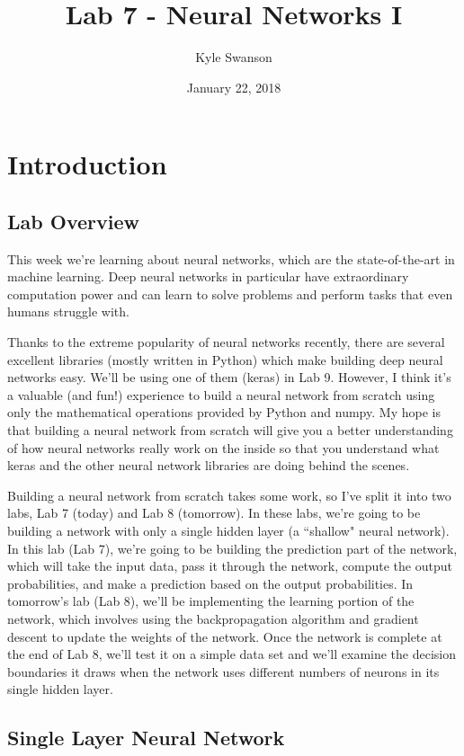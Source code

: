 \documentclass{article}
\title{Lab 7 - Neural Networks I}
\author{Kyle Swanson}
\date{January 22, 2018}
\begin{document}
\maketitle

\section{Introduction}

\subsection{Lab Overview}

This week we're learning about neural networks, which are the state-of-the-art in machine learning. Deep neural networks in particular have extraordinary computation power and can learn to solve problems and perform tasks that even humans struggle with.

Thanks to the extreme popularity of neural networks recently, there are several excellent libraries (mostly written in Python) which make building deep neural networks easy. We'll be using one of them (keras) in Lab 9. However, I think it's a valuable (and fun!) experience to build a neural network from scratch using only the mathematical operations provided by Python and numpy. My hope is that building a neural network from scratch will give you a better understanding of how neural networks really work on the inside so that you understand what keras and the other neural network libraries are doing behind the scenes.

Building a neural network from scratch takes some work, so I've split it into two labs, Lab 7 (today) and Lab 8 (tomorrow). In these labs, we're going to be building a network with only a single hidden layer (a ``shallow" neural network). In this lab (Lab 7), we're going to be building the prediction part of the network, which will take the input data, pass it through the network, compute the output probabilities, and make a prediction based on the output probabilities. In tomorrow's lab (Lab 8), we'll be implementing the learning portion of the network, which involves using the backpropagation algorithm and gradient descent to update the weights of the network. Once the network is complete at the end of Lab 8, we'll test it on a simple data set and we'll examine the decision boundaries it draws when the network uses different numbers of neurons in its single hidden layer.

\subsection{Single Layer Neural Network}
\end{document}
